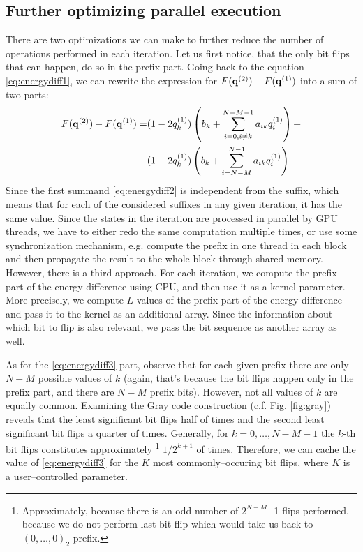 \subsection{Further optimizing parallel execution}

There are two optimizations we can make to further reduce the number of
operations performed in each iteration. Let us first notice, that the only bit
flips that can happen, do so in the prefix part. Going back to the equation
\eqref{eq:energydiff1}, we can rewrite the expression for $F(\mathbf{q}^{(2)})-F(\mathbf{q}^{(1)})$
into a sum of two parts:
\begin{align}
  F(\mathbf{q}^{(2)})-F(\mathbf{q}^{(1)}) = & (1-2q^{(1)}_{k}) \left(b_{k} + \sum_{i=0,i\ne k}^{N-M-1}a_{ik}q^{(1)}_{i}\right) + \label{eq:energydiff2} \\
                        & (1-2q^{(1)}_{k}) \left(b_{k} + \sum_{i=N-M}^{N-1}a_{ik}q^{(1)}_{i}\right)\label{eq:energydiff3}
\end{align}
Since the first summand \eqref{eq:energydiff2} is independent from the suffix,
which means that for each of the considered suffixes in any given iteration, it
has the same value. Since the states in the iteration are processed in parallel
by GPU threads, we have to either redo the same computation multiple times, or
use some synchronization mechanism, e.g. compute the prefix in one thread in
each block and then propagate the result to the whole block through shared
memory. However, there is a third approach. For each iteration, we compute the
prefix part of the energy difference using CPU, and then use it as a kernel
parameter. More precisely, we compute $L$ values of the prefix part of the
energy difference and pass it to the kernel as an additional array. Since the
information about which bit to flip is also relevant, we pass the bit sequence
as another array as well.

As for the \eqref{eq:energydiff3} part, observe that for each given prefix
there are only $N-M$ possible values of $k$ (again, that's because the bit
flips happen only in the prefix part, and there are $N-M$ prefix bits).
However, not all values of $k$ are equally common. Examining the Gray code
construction (c.f. Fig. \ref{fig:gray}) reveals that the least significant bit
flips half of times and the second least significant bit flips a quarter of
times. Generally, for $k=0,\ldots,N-M-1$ the $k$-th bit flips constitutes
approximately \footnote{Approximately, because there is an odd number of
  $2^{N-M}$ -1 flips performed, because we do not perform last bit flip which
  would take us back to $(0,\ldots,0)_2$ prefix.} $1/2^{k+1}$ of times.
Therefore, we can cache the value of \eqref{eq:energydiff3} for the $K$ most
commonly--occuring bit flips, where $K$ is a user--controlled parameter.

